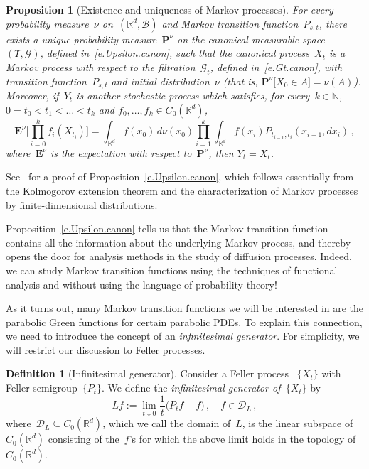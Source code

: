 \documentclass[11pt]{article} %
\numberwithin{equation}{section}
\newtheorem{proposition}[theorem]{Proposition}
\theoremstyle{definition}
\newtheorem{definition}[theorem]{Definition}
\newcommand*{\N}{\ensuremath{\mathbb{N}}}
\newcommand*{\Rd}{\ensuremath{\mathbb{R}^d}}
\begin{document}
\begin{proposition}[Existence and uniqueness of Markov processes]
\label{p.Kolmogorov}
\hspace{0.1pt}
For every probability measure~$\nu$ on~$(\Rd,\mathscr{B})$ and Markov transition function~$P_{s,t}$,  there exists a unique probability measure~$\mathbf{P}^\nu$ on the canonical measurable space~$(\Upsilon,\mathcal{G})$, defined in~\eqref{e.Upsilon.canon}, such that the canonical process~$X_t$ is a Markov process with respect to the filtration~$\mathcal{G}_t$, defined in~\eqref{e.Gt.canon}, with transition function~$P_{s,t}$ and initial distribution~$\nu$ (that is, $\mathbf{P}^\nu \bigl[ X_0 \in A \bigr] = \nu(A)$). 
Moreover, if~$Y_t$ is another stochastic process which satisfies, for every~$k\in\N$, ~$0 = t_0 < t_1 < \ldots < t_k$ and $f_0,\ldots, f_k \in C_0(\Rd)$, 
\begin{equation}
\label{e.finitedimdist}
\mathbf{E}^\nu\Biggl[ \prod_{i=0}^k f_i(X_{t_i}) \Biggr] 
=
\int_{\Rd} f(x_0)\,d\nu(x_0)
\prod_{i=1}^k
\int_{\Rd} f(x_i) P_{t_{i-1},t_i} (x_{i-1},dx_i)\,,
\end{equation}
where~$\mathbf{E}^\nu$ is the expectation with respect to~$\mathbf{P}^\nu$, then $Y_t = X_t$. 
\end{proposition}

See~\cite[III.1.4 \& III.1.5]{RY} for a proof of Proposition~\ref{e.Upsilon.canon}, which follows essentially from the Kolmogorov extension theorem and the characterization of Markov processes by finite-dimensional distributions. 

\smallskip

Proposition~\ref{e.Upsilon.canon} tells us that the Markov transition function contains all the information about the underlying Markov process, and thereby opens the door for analysis methods in the study of diffusion processes. Indeed, we can study Markov transition functions using the techniques of functional analysis and without using the language of probability theory!

\smallskip

As it turns out, many Markov transition functions we will be interested in are the parabolic Green functions for certain parabolic PDEs. To explain this connection, we need to introduce the concept of an \emph{infinitesimal generator}. For simplicity, we will restrict our discussion to Feller processes.

\begin{definition}[Infinitesimal generator]
Consider a Feller process~ $\{ X_t \}$ with Feller semigroup~$\{ P_t\}$.
We define the \emph{infinitesimal generator of~$\{X_t\}$} by
\begin{equation}
\label{e.generator}
L f:= 
\lim_{t \downarrow 0} 
\frac1t 
\bigl( P_t f  - f \bigr)\,, \quad f \in \mathscr{D}_L\,, 
\end{equation}
where~$\mathscr{D}_L \subseteq C_0(\Rd)$, which we call the domain of~$L$, is the linear subspace of~$C_0(\Rd)$ consisting of the~$f$'s for which the above limit holds in the topology of~$C_0(\Rd)$. 
\end{definition}
\end{document}

